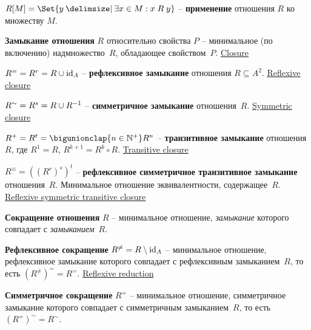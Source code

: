 \documentclass[a4paper,10pt]{article}
\begin{document}
\begin{terms}
    \item $R[M] = \Set{y \given \exists x \in M : x \rel y}$ \--- \textbf{применение} отношения $R$ ко множеству $M$.

    \item \textbf{Замыкание отношения} $R$ относительно свойства $P$ \--- минимальное (по включению) надмножество~$R$, обладающее свойством~$P$.
    \hfill\href{https://en.wikipedia.org/wiki/Closure_(mathematics)#Binary_relation_closures}{Closure}

    \begin{terms}
        \item $R^{=} = R^{r} = R \cup \mathrm{id}_{A}$ \--- \textbf{рефлексивное замыкание} отношения $R \subseteq A^2$.
        \hfill\href{https://en.wikipedia.org/wiki/Reflexive_closure}{Reflexive closure}

        \item $R^{\sim} = R^{s} = R \cup R^{-1}$ \--- \textbf{симметричное замыкание} отношения~$R$.
        \hfill\href{https://en.wikipedia.org/wiki/Symmetric_closure}{Symmetric closure}

        \item $R^{+} = R^{t} = \bigunionclap{n \in \NaturalPlus} R^n$ \--- \textbf{транзитивное замыкание} отношения $R$, где $R^1 = R$, $R^{k+1} = R^k \circ R$.
        \hfill\href{https://en.wikipedia.org/wiki/Transitive_closure}{Transitive closure}

        \item $R^{\equiv} = ((R^{r})^{s})^{t}$ \--- \textbf{рефлексивное симметричное транзитивное замыкание} отношения~$R$. Минимальное отношение эквивалентности, содержащее~$R$.
        \hfill\href{https://en.wikipedia.org/wiki/Reflexive_symmetric_transitive_closure}{Reflexive symmetric transitive closure}
    \end{terms}

    \item \textbf{Сокращение отношения} $R$ \--- минимальное отношение, \textit{замыкание} которого совпадает с \textit{замыканием}~$R$.

    \begin{terms}
        \item \textbf{Рефлексивное сокращение} $R^{\neq} = R \setminus \mathrm{id}_{A}$ \--- минимальное отношение, рефлексивное замыкание которого совпадает с рефлексивным замыканием~$R$, то есть $(R^{\neq})^{=} = R^{=}$.
        \hfill\href{https://en.wikipedia.org/wiki/Reflexive_reduction}{Reflexive reduction}

        \item \textbf{Симметричное сокращение} $R^{\nsim}$ \--- минимальное отношение, симметричное замыкание которого совпадает с симметричным замыканием~$R$, то есть $(R^{\nsim})^{\sim} = R^{\sim}$.


\end{terms}
\end{terms}
\end{document}
